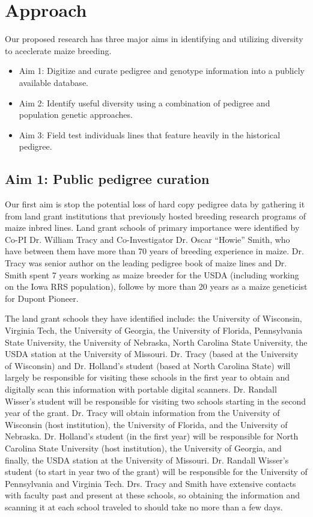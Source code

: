 \documentclass[12pt]{article}
\begin{document}
{\section*{Approach}
\label{sec:approach}
Our proposed research has three major aims in identifying and utilizing diversity to aceclerate maize breeding.

\begin{itemize}
\item Aim 1: Digitize and curate pedigree and genotype information into a publicly available database. 
\item Aim 2: Identify useful diversity using a combination of pedigree and population genetic approaches.
\item Aim 3: Field test individuals lines that feature heavily in the historical pedigree.
\end{itemize}

\subsection*{Aim 1: Public pedigree curation}
Our first aim is stop the potential loss of hard copy pedigree data by gathering it from land grant institutions that previously hosted breeding research programs of maize inbred lines. 
Land grant schools of primary importance were identified by Co-PI Dr. William Tracy and Co-Investigator Dr. Oscar ``Howie'' Smith, who have between them have more than 70 years of breeding experience in maize. 
Dr. Tracy was senior author on the leading pedigree book of maize lines \cite{gerdes1993compilation} and Dr. Smith spent 7 years working as maize breeder for the USDA (including working on the Iowa RRS population), followe by more than 20 years as a maize geneticist for Dupont Pioneer.

The land grant schools they have identified include: the University of Wisconsin, Virginia Tech, the University of Georgia, the University of Florida, Pennsylvania State University, the University of Nebraska, North Carolina State University, the USDA station at the University of Missouri. 
Dr. Tracy (based at the University of Wisconsin) and Dr. Holland's student (based at North Carolina State) will largely be responsible for visiting these schools in the first year to obtain and digitally scan this information with portable digital scanners. 
Dr. Randall Wisser's student will be responsible for visiting two schools starting in the second year of the grant.
Dr. Tracy will obtain information from the University of Wisconsin (host institution), the University of Florida, and the University of Nebraska. 
Dr. Holland's student (in the first year) will be responsible for North Carolina State University (host institution), the University of Georgia, and finally, the USDA station at the University of Missouri. 
Dr. Randall Wisser's student (to start in year two of the grant) will be responsible for the University of Pennsylvania and Virginia Tech.
Drs. Tracy and Smith have extensive contacts with faculty past and present at these schools, so obtaining the information and scanning it at each school traveled to should take no more than a few days. 

}
\end{document}
